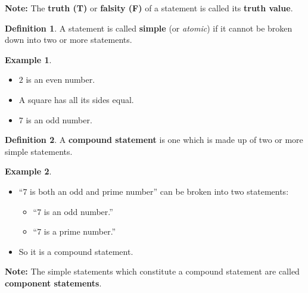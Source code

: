\documentclass[
]{book}
\providecommand{\tightlist}{%
  \setlength{\itemsep}{0pt}\setlength{\parskip}{0pt}}
\theoremstyle{definition}
\newtheorem{definition}{Definition}[chapter]
\theoremstyle{definition}
\newtheorem{example}{Example}[chapter]
\theoremstyle{definition}
\theoremstyle{definition}
\theoremstyle{remark}
\begin{document}
\textbf{Note:} The \textbf{truth (T)} or \textbf{falsity (F)} of a statement is called its \textbf{truth value}.

\begin{definition}
\protect\hypertarget{def:unnamed-chunk-7}{}\label{def:unnamed-chunk-7}A statement is called \textbf{simple} (or \emph{atomic}) if it cannot be broken down into two or more statements.
\end{definition}

\begin{example}
\protect\hypertarget{exm:unnamed-chunk-8}{}\label{exm:unnamed-chunk-8}\leavevmode

\begin{itemize}
\tightlist
\item
  \(2\) is an even number.
\item
  A square has all its sides equal.
\item
  \(7\) is an odd number.
\end{itemize}

\end{example}

\begin{definition}
\protect\hypertarget{def:unnamed-chunk-9}{}\label{def:unnamed-chunk-9}A \textbf{compound statement} is one which is made up of two or more simple statements.
\end{definition}

\begin{example}
\protect\hypertarget{exm:unnamed-chunk-10}{}\label{exm:unnamed-chunk-10}\leavevmode

\begin{itemize}
\tightlist
\item
  ``\(7\) is both an odd and prime number'' can be broken into two statements:

  \begin{itemize}
  \tightlist
  \item
    ``\(7\) is an odd number.''
  \item
    ``\(7\) is a prime number.''\\
  \end{itemize}
\item
  So it is a compound statement.
\end{itemize}

\end{example}

\textbf{Note:} The simple statements which constitute a compound statement are called \textbf{component statements}.
\end{document}
